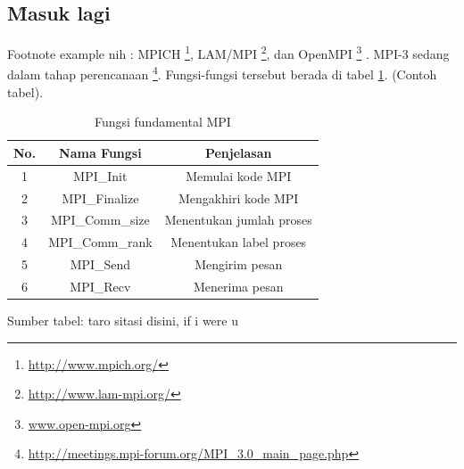 \subsection{\f{Masuk lagi}}
Footnote example nih : MPICH \footnote{\url{http://www.mpich.org/}}, LAM/MPI \footnote{\url{http://www.lam-mpi.org/}}, dan OpenMPI \footnote{\url{www.open-mpi.org}} \citep{article.mcguire}. MPI-3 sedang dalam tahap perencanaan \footnote{\url{http://meetings.mpi-forum.org/MPI_3.0_main_page.php}}. Fungsi-fungsi tersebut berada di tabel \ref{tab:mpifund}. (Contoh tabel).

\begin{table}
	\centering
	\caption{Fungsi fundamental MPI}
	\label{tab:mpifund}
	\begin{tabular}{|c|c|c|}
	\hline
	\rowcolor{headertbl}	
	\hline No. & Nama Fungsi & Penjelasan \\ 
	\hline 1 & MPI\_Init & Memulai kode MPI \\ 
	\hline 2 & MPI\_Finalize & Mengakhiri kode MPI \\ 
	\hline 3 & MPI\_Comm\_size & Menentukan jumlah proses \\ 
	\hline 4 & MPI\_Comm\_rank & Menentukan label proses \\ 
	\hline 5 & MPI\_Send & Mengirim pesan \\ 
	\hline 6 & MPI\_Recv & Menerima pesan \\ 
	\hline
	\end{tabular}
\end{table}
\begin{center}
{\small Sumber tabel: taro sitasi disini, if i were u}
\end{center}